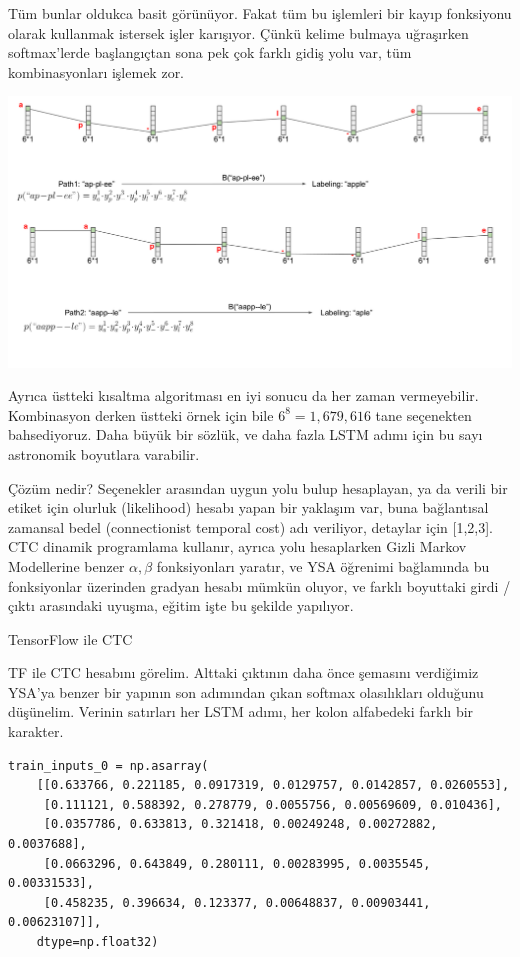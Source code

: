\documentclass[12pt,fleqn]{article}\usepackage{../../common}
\begin{document}
Tüm bunlar oldukca basit görünüyor. Fakat tüm bu işlemleri bir kayıp
fonksiyonu olarak kullanmak istersek işler karışıyor. Çünkü kelime bulmaya
uğraşırken softmax'lerde başlangıçtan sona pek çok farklı gidiş yolu var,
tüm kombinasyonları işlemek zor.

\includegraphics[width=37em]{ocr_05.png}

Ayrıca üstteki kısaltma algoritması en iyi sonucu da her zaman
vermeyebilir. Kombinasyon derken üstteki örnek için bile $6^8 = 1,679,616$
tane seçenekten bahsediyoruz. Daha büyük bir sözlük, ve daha fazla LSTM
adımı için bu sayı astronomik boyutlara varabilir.

Çözüm nedir? Seçenekler arasından uygun yolu bulup hesaplayan, ya da verili
bir etiket için olurluk (likelihood) hesabı yapan bir yaklaşım var, buna
bağlantısal zamansal bedel (connectionist temporal cost) adı veriliyor,
detaylar için [1,2,3]. CTC dinamik programlama kullanır, ayrıca yolu
hesaplarken Gizli Markov Modellerine benzer $\alpha,\beta$ fonksiyonları
yaratır, ve YSA öğrenimi bağlamında bu fonksiyonlar üzerinden gradyan
hesabı mümkün oluyor, ve farklı boyuttaki girdi / çıktı arasındaki uyuşma,
eğitim işte bu şekilde yapılıyor.

TensorFlow ile CTC

TF ile CTC hesabını görelim. Alttaki çıktının daha önce şemasını verdiğimiz
YSA'ya benzer bir yapının son adımından çıkan softmax olasılıkları olduğunu
düşünelim. Verinin satırları her LSTM adımı, her kolon alfabedeki farklı
bir karakter. 

\begin{verbatim}
train_inputs_0 = np.asarray(
    [[0.633766, 0.221185, 0.0917319, 0.0129757, 0.0142857, 0.0260553],
     [0.111121, 0.588392, 0.278779, 0.0055756, 0.00569609, 0.010436],
     [0.0357786, 0.633813, 0.321418, 0.00249248, 0.00272882, 0.0037688],
     [0.0663296, 0.643849, 0.280111, 0.00283995, 0.0035545, 0.00331533],
     [0.458235, 0.396634, 0.123377, 0.00648837, 0.00903441, 0.00623107]],
    dtype=np.float32)
\end{verbatim}
\end{document}
